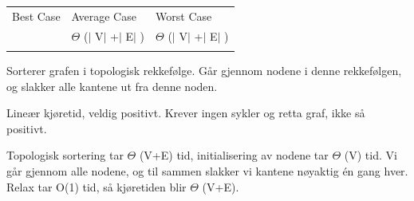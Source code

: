 \documentclass[12pt]{report}
\begin{document}
\begin{multicols}{2}

{\fontsize{10pt}{12.0pt}\selectfont \par}\par


\vspace{\baselineskip}

\vspace{\baselineskip}

\end{multicols}




\begin{table}[H]
 			\centering
\begin{tabular}{p{1.92in}p{2.32in}p{1.83in}}
\hline
\multicolumn{1}{p{1.92in}}{{\fontsize{13pt}{15.6pt}\selectfont Best Case}} & 
\multicolumn{1}{p{2.32in}}{{\fontsize{13pt}{15.6pt}\selectfont Average Case}} & 
\multicolumn{1}{p{1.83in}}{{\fontsize{13pt}{15.6pt}\selectfont Worst Case}} \\
\hhline{---}
\multicolumn{1}{p{1.92in}}{{\fontsize{14pt}{16.8pt}\selectfont $ \Theta $ ($ \vert $ V$ \vert $ +$ \vert $ E$ \vert $ )}} & 
\multicolumn{1}{p{2.32in}}{{\fontsize{14pt}{16.8pt}\selectfont $ \Theta $ ($ \vert $ V$ \vert $ +$ \vert $ E$ \vert $ )}} & 
\multicolumn{1}{p{1.83in}}{{\fontsize{14pt}{16.8pt}\selectfont $ \Theta $ ($ \vert $ V$ \vert $ +$ \vert $ E$ \vert $ )}} \\
\hhline{---}

\end{tabular}
 \end{table}




\vspace{\baselineskip}
Sorterer grafen i topologisk rekkefølge. Går gjennom nodene i denne rekkefølgen, og slakker alle kantene ut fra denne noden. \par

Lineær kjøretid, veldig positivt. Krever ingen sykler og retta graf, ikke så positivt.\par


\vspace{\baselineskip}
Topologisk sortering tar $ \Theta $ (V+E) tid, initialisering av nodene tar $ \Theta $ (V) tid. Vi går gjennom alle nodene, og til sammen slakker vi kantene nøyaktig én gang hver. Relax tar O(1) tid, så kjøretiden blir $ \Theta $ (V+E). \par
\end{document}
